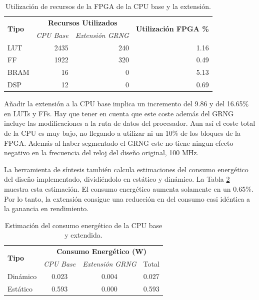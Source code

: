 \begin{table}[h]
\centering
\caption{Utilización de recursos de la FPGA de la CPU base y la extensión.}
\label{tab:riscv_fpga_utilization}
\begin{tabular}{lrrr}
\hline
\multirow{2}{*}{\textbf{Tipo}} & \multicolumn{2}{c}{\textbf{Recursos Utilizados}} & \multirow{2}{*}{\textbf{Utilización FPGA \%}}\\
 & \textit{CPU Base} & \textit{Extensión GRNG} & \\ \hline
LUT	        & 2435 & 240 & 1.16 \\
FF	        & 1922 & 320 & 0.49 \\
BRAM	    & 16   & 0 & 5.13 \\
DSP	        & 12   & 0 & 0.69 \\ \hline
\end{tabular}
\end{table}

Añadir la extensión a la CPU base implica un incremento del 9.86 y del 16.65\% en LUTs y FFs. Hay que tener en cuenta que este coste además del GRNG incluye las modificaciones a la ruta de datos del procesador. Aun así el coste total de la CPU es muy bajo, no llegando a utilizar ni un 10\% de los bloques de la FPGA. Además al haber segmentado el GRNG este no tiene ningun efecto negativo en la frecuencia del reloj del diseño original, 100 MHz.

La herramienta de síntesis también calcula estimaciones del consumo energético del diseño implementado, dividiéndolo en estático y dinámico. La Tabla \ref{tab:riscv_fpga_power} muestra esta estimación. El consumo energético aumenta solamente en un 0.65\%. Por lo tanto, la extensión consigue una reducción en del consumo casi idéntica a la ganancia en rendimiento.

\begin{table}[h]
\centering
\caption{Estimación del consumo energético de la CPU base y extendida.}
\label{tab:riscv_fpga_power}
\begin{tabular}{lccc}
\hline
\multirow{2}{*}{\textbf{Tipo}} & \multicolumn{3}{c}{\textbf{Consumo Energético (W)}} \\
 & \textit{CPU Base} & \textit{Extensión GRNG} & Total \\ \hline
Dinámico & 0.023 & 0.004 & 0.027\\
Estático & 0.593 & 0.000 & 0.593\\ \hline
\end{tabular}
\end{table}
